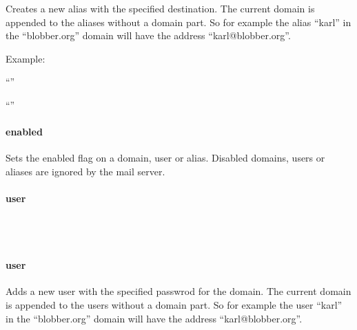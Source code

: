 
Creates a new alias with the specified destination. The current domain is appended
to the aliases without a domain part. So for example the alias ``karl''
in the ``blobber.org'' domain will have the address ``karl@blobber.org''.

Example:

\begin{compactitem}
\item ``''
\item ``''
\end{compactitem}

\paragraph{enabled}


Sets the enabled flag on a domain, user or alias. Disabled domains, users or
aliases are ignored by the mail server.

\paragraph{user}

\\
\\

\paragraph{user}


Adds a new user with the specified passwrod for the domain.
The current domain is appended
to the users without a domain part. So for example the user ``karl''
in the ``blobber.org'' domain will have the address ``karl@blobber.org''.

